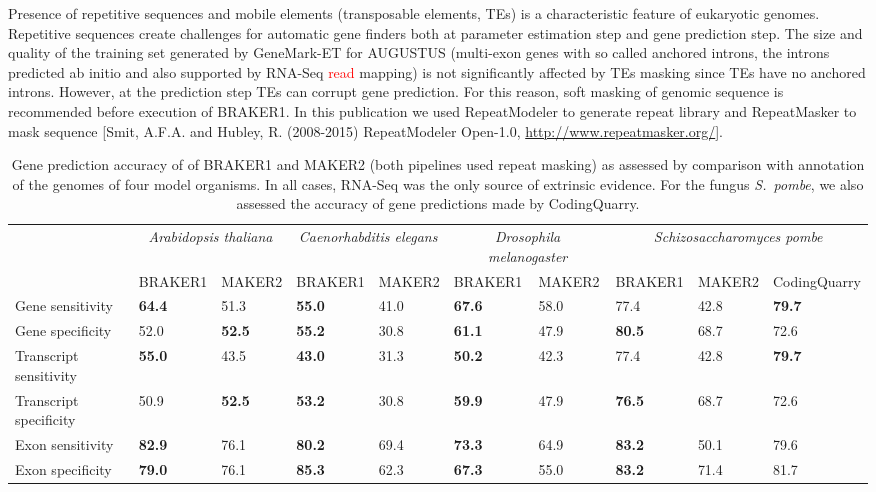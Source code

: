 \documentclass[a4paper,10pt]{article}
\begin{document}
Presence of repetitive sequences and mobile elements (transposable elements, TEs) is a characteristic feature of eukaryotic genomes. Repetitive sequences create challenges for automatic gene finders both at parameter estimation step and gene prediction step. The size and quality of the training set generated by GeneMark-ET for AUGUSTUS (multi-exon genes with so called anchored introns, the introns predicted ab initio and also supported by RNA-Seq \textcolor{red}{read} mapping) is not significantly affected by TEs masking since TEs have no anchored introns. However, at the prediction step TEs can corrupt gene prediction. For this reason, soft masking of genomic sequence is recommended before execution of BRAKER1. In this publication we used RepeatModeler to generate repeat library and RepeatMasker to mask sequence [Smit, A.F.A. and Hubley, R. (2008-2015) RepeatModeler Open-1.0, \url{http://www.repeatmasker.org/}].

\begin{table}
\caption{Gene prediction accuracy of of BRAKER1 and MAKER2 (both pipelines used repeat masking) as assessed by comparison with annotation of the genomes of four model organisms. In all cases, RNA-Seq was the only source of extrinsic evidence. For the fungus \textit{S.~pombe}, we also assessed the accuracy of gene predictions made by CodingQuarry.\label{Tab:01}}
\begin{tabular}{lp{.9cm}p{.9cm}p{.9cm}p{.9cm}p{.9cm}p{.9cm}p{.9cm}p{.9cm}p{.9cm}}\hline
 & \multicolumn{2}{c}{\textit{Arabidopsis thaliana}} &  \multicolumn{2}{c}{\textit{Caenorhabditis elegans}} &  \multicolumn{2}{c}{\textit{Drosophila melanogaster}} &  \multicolumn{3}{c}{\textit{Schizosaccharomyces pombe}}\\
 & \tiny{BRAKER1} & \tiny{MAKER2} &  \tiny{BRAKER1} & \tiny{MAKER2}  & \tiny{BRAKER1} & \tiny{MAKER2} &\tiny{BRAKER1} & \tiny{MAKER2} &\tiny{CodingQuarry}\\
 \hline
Gene sensitivity        & \textbf{64.4} & 51.3          & \textbf{55.0} & 41.0 & \textbf{67.6} & 58.0 & 77.4 & 42.8 & \textbf{79.7}\\
Gene specificity        & 52.0          & \textbf{52.5} & \textbf{55.2} & 30.8 & \textbf{61.1} & 47.9 & \textbf{80.5} & 68.7 & 72.6\\
Transcript sensitivity  & \textbf{55.0} & 43.5          & \textbf{43.0} & 31.3 & \textbf{50.2} & 42.3 & 77.4 & 42.8 & \textbf{79.7}\\
Transcript specificity  & 50.9          & \textbf{52.5} & \textbf{53.2} & 30.8 & \textbf{59.9} & 47.9 & \textbf{76.5} & 68.7 & 72.6\\
Exon sensitivity        & \textbf{82.9} & 76.1          & \textbf{80.2} & 69.4 & \textbf{73.3} & 64.9 & \textbf{83.2} & 50.1 & 79.6\\
Exon specificity        & \textbf{79.0} & 76.1          & \textbf{85.3} & 62.3 & \textbf{67.3} & 55.0 & \textbf{83.2} & 71.4 & 81.7\\
\hline

\end{tabular}
\end{table}
\end{document}

